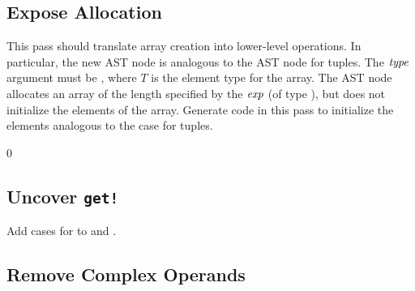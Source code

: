 \documentclass[7x10]{TimesAPriori_MIT}%
\def\racketEd{0}
\def\edition{1}
\numberwithin{theorem}{chapter}
\numberwithin{definition}{chapter}
\numberwithin{equation}{chapter}
\begin{document}


\subsection{Expose Allocation}


This pass should translate array creation into lower-level
operations. In particular, the new AST node \ALLOCARRAY{\Int}{\Type}
is analogous to the  AST node for tuples.  The $\mathit{type}$
argument must be , where $T$ is the element type for the
array. The  AST node allocates an array of the
length specified by the $\mathit{exp}$ (of type \INTTY), but does not
initialize the elements of the array. Generate code in this pass to
initialize the elements analogous to the case for tuples.


{\if\edition\racketEd
\subsection{Uncover \texttt{get!}}
\label{sec:uncover-get-bang-vecof}

Add cases for  to  and
.

\fi}

\subsection{Remove Complex Operands}
\end{document}
